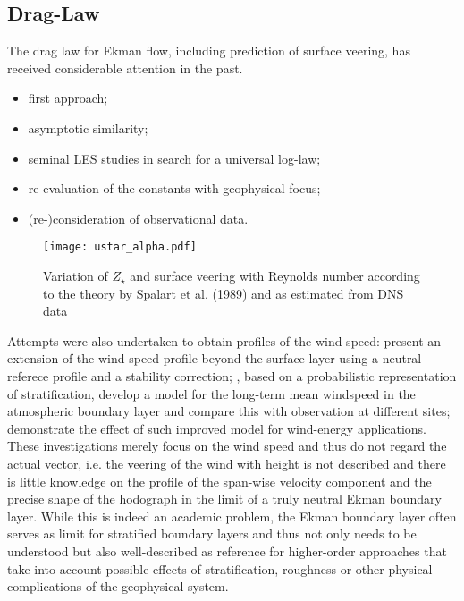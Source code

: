 \documentclass[a4paper,11pt]{article}
\begin{document}
\subsection{Drag-Law} 
The drag law for Ekman flow, including prediction of surface veering, has received considerable attention in the past.
\begin{itemize}
\item \cite{Rossby:1935wa} first approach;
\item \cite{Tennekes:1973jh, Blackadar:1968ew} asymptotic similarity;
\item \cite{Spalart:1989p2436, Spalart:2008p2432, Spalart:2009p2466} seminal LES studies in search for a universal log-law;
\item \cite{Ansorge:2014hf, Ansorge:2019di} re-evaluation of the constants with geophysical focus;
\item \cite{Hogstrom:1988wg, Hgstrm:1996kt} (re-)consideration of observational data.

\end{itemize}
\begin{figure}
  \centerline{\texttt{[image: ustar\_alpha.pdf]}}
  \caption{Variation of $Z_\star$ and surface veering with Reynolds number according to
    the theory by Spalart et al. (1989) and as estimated from DNS data}
  \label{fig:drag_law}
\end{figure} 
%
Attempts were also undertaken to obtain profiles of the wind speed: 
\cite{Gryning:2007dy} present an extension of the wind-speed profile beyond the surface layer using a neutral referece profile
and a stability correction;
\cite{Kelly:2010ev}, based on a probabilistic representation of stratification, develop a model for the long-term mean windspeed
in the atmospheric boundary layer and compare this with observation at different sites; 
\cite{Kelly:2016bs} demonstrate the effect of such improved model for wind-energy applications.
%
These investigations merely focus on the wind speed and thus do not regard the actual vector, i.e. the veering of
the wind with height is not described and there is little knowledge on the profile of the span-wise velocity component
and the precise shape of the hodograph in the limit of a truly neutral Ekman boundary layer.
%
While this is indeed an academic problem, the Ekman boundary layer often serves as limit for stratified boundary layers
and thus not only needs to be understood but also well-described as reference for higher-order approaches that take into
account possible effects of stratification, roughness or other physical complications of the geophysical system.
%
\end{document}
